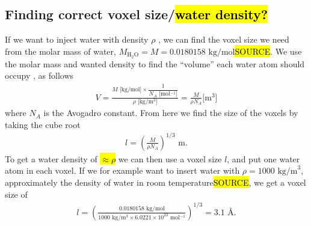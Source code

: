 \subsection[Finding correct voxel size/water density?]{Finding correct voxel size/\hl{water density?}}
If we want to inject water with density $\rho$%
, we can find the voxel size we need from the molar mass of water, $M_\text{H$_2$O} = M = 0.0180158 \text{ kg/mol}$\hl{SOURCE}. We use the molar mass and wanted density to find the ``volume'' each water atom should occupy%
, as follows
\begin{align*}
    V 
    = \frac{ M\text{ [kg/mol]} \times \dfrac{1}{N_A \text{ [mol$^{-1}$]}}}{ \rho\text{ [kg/m$^3$]} } 
    = \frac{M}{\rho N_A}\text{[m$^3$]}
\end{align*}
where $N_A$ is the Avogadro constant. From here we find the size of the voxels by taking the cube root
\begin{align}
    l = \left(\frac{M}{\rho N_A} \right)^{1/3}\text{ m}.
    \label{eq:inject_water_voxel_size}
\end{align}
To get a water density of \hl{$\approx \rho$} we can then use a voxel size $l$, and put one water atom in each voxel. If we for example want to insert water with $\rho = 1000\text{ kg/m}^3$, approximately the density of water in room temperature\hl{SOURCE}, we get a voxel size of
\begin{align*}
    l = \left(\frac{0.0180158 \text{ kg/mol}}{1000\text{ kg/m$^3$} \times 6.0221 \times 10^{23}\text{ mol$^{-1}$}} \right)^{1/3} = 3.1 \text{ \AA}.
\end{align*}

